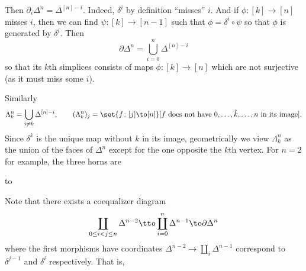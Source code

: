 Then $\partial_i\Delta^n=\Delta^{[n]-i}$.
Indeed, $\delta^i$ by definition ``misses'' $i$.
And if $\phi\colon[k]\to[n]$ misses $i$, then we can find $\psi\colon[k]\to[n-1]$ such that $\phi=\delta^i\circ\psi$ so that $\phi$ is generated by $\delta^i$.
Then
$$ \partial\Delta^n = \bigcup_{i=0}^n\Delta^{[n]-i} $$
so that its $k$th simplices consists of maps $\phi\colon[k]\to[n]$ which are not surjective (as it must miss some $i$).

Similarly
$$ \Lambda^n_k = \bigcup_{i\neq k}\Delta^{[n]-i},\qquad (\Lambda^n_k)_j = \set{f\colon[j]\to[n]}[\hbox{$f$ does not have $0,\dots,\hat k,\dots,n$ in its image}] . $$
Since $\delta^k$ is the unique map without $k$ in its image, geometrically we view $\Lambda^n_k$ as the union of the faces of $\Delta^n$
except for the one opposite the $k$th vertex.
For $n=2$ for example, the three horns are

\bigskip
\hbox to

Note that there exists a coequalizer diagram
$$ \coprod_{0\leq i<j\leq n}\Delta^{n-2} \tto \coprod_{i=0}^n\Delta^{n-1} \to \partial\Delta^n $$
where the first morphisms have coordinates $\Delta^{n-2}\to\coprod_i\Delta^{n-1}$ correspond to $\delta^{j-1}$ and $\delta^i$
respectively.
That is,

\bigskip
\centerline{}

